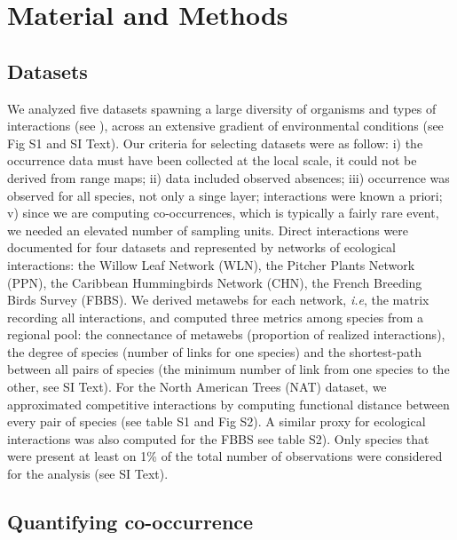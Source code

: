 \section{Material and Methods}\label{material-and-methods}

\subsection{Datasets}\label{datasets}

We analyzed five datasets spawning a large diversity of organisms and
types of interactions (see \citet{tbl:id}), across an extensive gradient
of environmental conditions (see Fig S1 and SI Text). Our criteria for
selecting datasets were as follow: i) the occurrence data must have been
collected at the local scale, it could not be derived from range maps;
ii) data included observed absences; iii) occurrence was observed for
all species, not only a singe layer; interactions were known a priori;
v) since we are computing co-occurrences, which is typically a fairly
rare event, we needed an elevated number of sampling units. Direct
interactions were documented for four datasets and represented by
networks of ecological interactions: the Willow Leaf Network (WLN), the
Pitcher Plants Network (PPN), the Caribbean Hummingbirds Network (CHN),
the French Breeding Birds Survey (FBBS). We derived metawebs for each
network, \emph{i.e}, the matrix recording all interactions, and computed
three metrics among species from a regional pool: the connectance of
metawebs (proportion of realized interactions), the degree of species
(number of links for one species) and the shortest-path between all
pairs of species (the minimum number of link from one species to the
other, see SI Text). For the North American Trees (NAT) dataset, we
approximated competitive interactions by computing functional distance
between every pair of species (see table S1 and Fig S2). A similar proxy
for ecological interactions was also computed for the FBBS see table
S2). Only species that were present at least on 1\% of the total number
of observations were considered for the analysis (see SI Text).

\subsection{Quantifying co-occurrence}\label{quantifying-co-occurrence}

